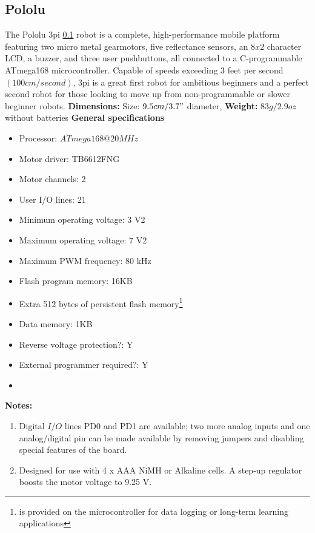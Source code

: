 \subsection{Pololu}
\label{Pololu}
The Pololu 3pi \ref{Pololu}  robot is a complete, high-performance mobile platform featuring two micro metal gearmotors, five reflectance sensors, an $8x2$ character LCD, a buzzer, and three user pushbuttons, all connected to a C-programmable ATmega168 microcontroller. Capable of speeds exceeding 3 feet per second $(100 cm/second)$, 3pi is a great first robot for ambitious beginners and a perfect second robot for those looking to move up from non-programmable or slower beginner robots.
\textbf{Dimensions:}
Size: 	$9.5 cm/3.7"$ diameter,
\textbf{Weight:}
$83 g/2.9 oz$ without batteries
\textbf{General specifications}
\begin{itemize}
\item Processor: 	$ATmega168 @ 20 MHz$
\item Motor driver: 	TB6612FNG
\item Motor channels: 	2
\item User I/O lines: 	21
\item Minimum operating voltage: 	3 V2
\item Maximum operating voltage: 	7 V2
\item Maximum PWM frequency: 	80 kHz
\item Flash program memory: 16KB
\item Extra 512 bytes of persistent flash memory\footnote{is provided on the microcontroller for data logging or long-term learning applications}
\item Data memory: 1KB
\item Reverse voltage protection?: 	Y
\item External programmer required?: 	Y
\item
\end{itemize}
\textbf{Notes:}
\begin{enumerate}
\item Digital $I/O$ lines PD0 and PD1 are available; two more analog inputs and one analog/digital pin can be made available by removing jumpers and disabling special features of the board.
\item Designed for use with 4 x AAA NiMH or Alkaline cells. A step-up regulator boosts the motor voltage to 9.25 V.
\end{enumerate}

